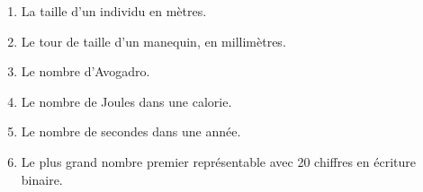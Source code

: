 \exer{}
\setcounter{numques}{0}


\begin{enumerate}[label=\emph{\alph*)}]
  \item La taille d'un individu en mètres. 
  \item Le tour de taille d'un manequin, en millimètres.
  \item Le nombre d'Avogadro.
  \item Le nombre de Joules dans une calorie.
  \item Le nombre de secondes dans une année.
  \item Le plus grand nombre premier représentable avec 20 chiffres en écriture binaire.
\end{enumerate}